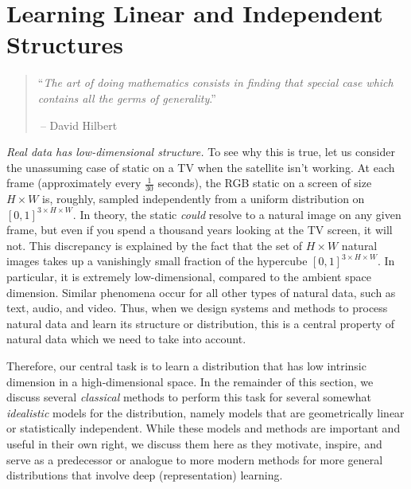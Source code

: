 \documentclass[../../book-main.tex]{subfiles}
\begin{document}
\chapter{Learning Linear and Independent Structures}
\label{ch:classic}\label{ch:linear-independent}

\begin{quote}
\hfill  ``{\em The art of doing mathematics consists in finding that special case which contains all the germs of generality}.''


$~$\hfill -- David Hilbert
\end{quote}
\vspace{5mm}







\textit{Real data has low-dimensional structure.} To see why this is true, let us consider the unassuming case of static on a TV when the satellite isn't working. At each frame (approximately every \(\frac{1}{30}\) seconds), the RGB static on a screen of size \(H \times W\) is, roughly, sampled independently from a uniform distribution on \([0, 1]^{3 \times H \times W}\). In theory, the static \textit{could} resolve to a natural image on any given frame, but even if you spend a thousand years looking at the TV screen, it will not. This discrepancy is explained by the fact that the set of \(H \times W\) natural images takes up a vanishingly small fraction of the hypercube \([0, 1]^{3 \times H \times W}\). In particular, it is extremely low-dimensional, compared to the ambient space dimension. Similar phenomena occur for all other types of natural data, such as text, audio, and video. Thus, when we design systems and methods to process natural data and learn its structure or distribution, this is a central property of natural data which we need to take into account. %

Therefore, our central task is to learn a distribution that has low intrinsic dimension in a high-dimensional space. In the remainder of this section, we discuss several \textit{classical} methods to perform this task for several somewhat {\em idealistic} models for the distribution, namely models that are geometrically linear or statistically independent. While these models and methods are important and useful in their own right, we discuss them here as they motivate, inspire, and serve as a predecessor or analogue to more modern methods for more general distributions that involve deep (representation) learning.
\end{document}
